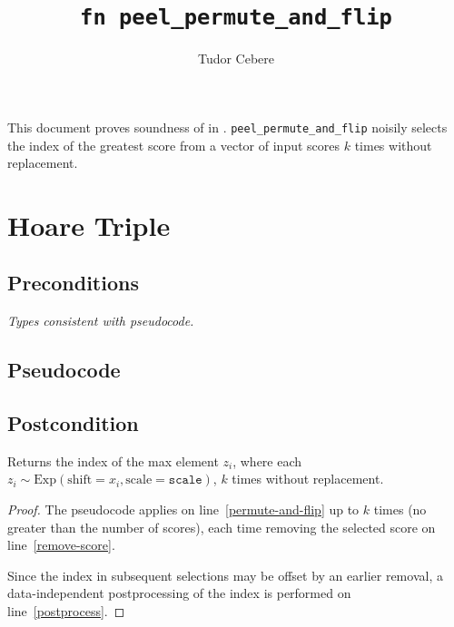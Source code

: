 \documentclass{article}
\title{\texttt{fn peel\_permute\_and\_flip}}
\author{Tudor Cebere}
\begin{document}
\maketitle\contrib
This document proves soundness of  in . 
\texttt{peel\_permute\_and\_flip} noisily selects the index of the greatest score from a vector of input scores $k$ times without replacement.

\section{Hoare Triple}
\subsection*{Preconditions}
\textit{Types consistent with pseudocode.}

\subsection*{Pseudocode}
\label{sec:python-pseudocode}


\subsection*{Postcondition}
\begin{theorem}
    \label{postcondition}
    Returns the index of the max element $z_i$,
    where each $z_i \sim \mathrm{Exp}(\mathrm{shift}=x_i, \mathrm{scale}=\texttt{scale})$, $k$ times without replacement.
\end{theorem}

\begin{proof}
    The pseudocode applies  on line~\ref{permute-and-flip}
    up to $k$ times (no greater than the number of scores),
    each time removing the selected score on line~\ref{remove-score}.

    Since the index in subsequent selections may be offset by an earlier removal,
    a data-independent postprocessing of the index is performed on line~\ref{postprocess}.
\end{proof}
\end{document}
